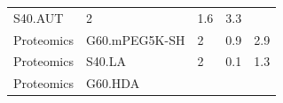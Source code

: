 \documentclass[utf8]{frontiersHLTH} %
\begin{document}
\begin{longtable}[]{@{}lllll@{}}
\begin{minipage}[t]{0.21\columnwidth}
S40.AUT\strut
\end{minipage} & \begin{minipage}[t]{0.06\columnwidth}\raggedright\strut
2\strut
\end{minipage} & \begin{minipage}[t]{0.15\columnwidth}\raggedright\strut
1.6\strut
\end{minipage} & \begin{minipage}[t]{0.08\columnwidth}\raggedright\strut
3.3\strut
\end{minipage}\tabularnewline
\begin{minipage}[t]{0.26\columnwidth}\raggedright\strut
Proteomics\strut
\end{minipage} & \begin{minipage}[t]{0.21\columnwidth}\raggedright\strut
G60.mPEG5K-SH\strut
\end{minipage} & \begin{minipage}[t]{0.06\columnwidth}\raggedright\strut
2\strut
\end{minipage} & \begin{minipage}[t]{0.15\columnwidth}\raggedright\strut
0.9\strut
\end{minipage} & \begin{minipage}[t]{0.08\columnwidth}\raggedright\strut
2.9\strut
\end{minipage}\tabularnewline
\begin{minipage}[t]{0.26\columnwidth}\raggedright\strut
Proteomics\strut
\end{minipage} & \begin{minipage}[t]{0.21\columnwidth}\raggedright\strut
S40.LA\strut
\end{minipage} & \begin{minipage}[t]{0.06\columnwidth}\raggedright\strut
2\strut
\end{minipage} & \begin{minipage}[t]{0.15\columnwidth}\raggedright\strut
0.1\strut
\end{minipage} & \begin{minipage}[t]{0.08\columnwidth}\raggedright\strut
1.3\strut
\end{minipage}\tabularnewline
\begin{minipage}[t]{0.26\columnwidth}\raggedright\strut
Proteomics\strut
\end{minipage} & \begin{minipage}[t]{0.21\columnwidth}\raggedright\strut
G60.HDA\strut
\end{minipage} & \begin{minipage}[t]{0.06\columnwidth}\raggedright\strut

\end{minipage}
\end{longtable}
\end{document}
